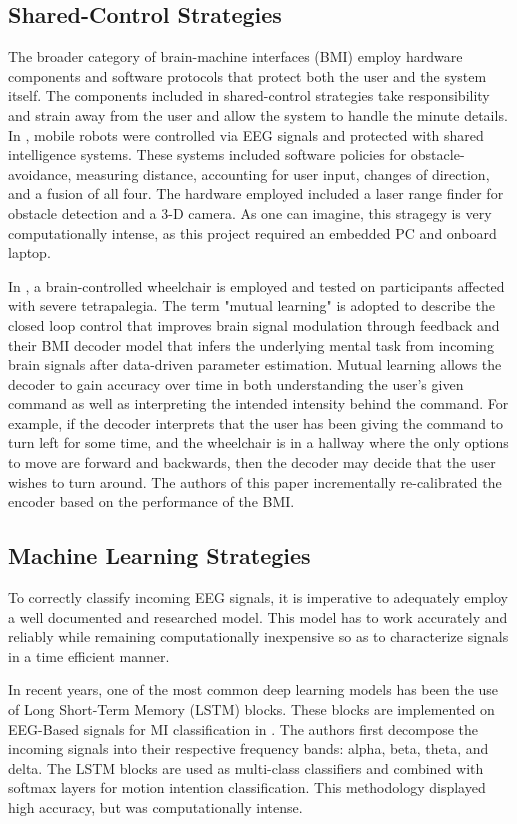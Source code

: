 \documentclass[conference]{IEEEtran}
\begin{document}
    \subsection{Shared-Control Strategies}
    The broader category of brain-machine interfaces (BMI) employ hardware components and software protocols that protect both the user and the system itself. The components included in shared-control strategies take responsibility and strain away from the user and allow the system to handle the minute details. In \cite{robo-teleop}, mobile robots were controlled via EEG signals and protected with shared intelligence systems. These systems included software policies for obstacle-avoidance, measuring distance, accounting for user input, changes of direction, and a fusion of all four. The hardware employed included a laser range finder for obstacle detection and a 3-D camera. As one can imagine, this stragegy is very computationally intense, as this project required an embedded PC and onboard laptop.  

    In \cite{learning_to_control}, a brain-controlled wheelchair is employed and tested on participants affected with severe tetrapalegia. The term "mutual learning" is adopted to describe the closed loop control that improves brain signal modulation through feedback and their BMI decoder model that infers the underlying mental task from incoming brain signals after data-driven parameter estimation. Mutual learning allows the decoder to gain accuracy over time in both understanding the user's given command as well as interpreting the intended intensity behind the command. For example, if the decoder interprets that the user has been giving the command to turn left for some time, and the wheelchair is in a hallway where the only options to move are forward and backwards, then the decoder may decide that the user wishes to turn around. The authors of this paper incrementally re-calibrated the encoder based on the performance of the BMI. 

    \subsection{Machine Learning Strategies}
    To correctly classify incoming EEG signals, it is imperative to adequately employ a well documented and researched model. This model has to work accurately and reliably while remaining computationally inexpensive so as to characterize signals in a time efficient manner.  

    In recent years, one of the most common deep learning models has been the use of Long Short-Term Memory (LSTM) blocks. These blocks are implemented on EEG-Based signals for MI classification in \cite{lstm_eeg}. The authors first decompose the incoming signals into their respective frequency bands: alpha, beta, theta, and delta. The LSTM blocks are used as multi-class classifiers and combined with softmax layers for motion intention classification. This methodology displayed high accuracy, but was computationally intense. 
\end{document}
